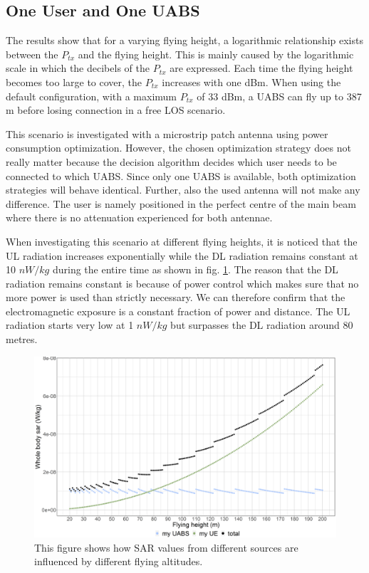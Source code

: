 \documentclass[twocolumn]{phdsymp} %
\begin{document}
\subsection{One User and One \gls{UABS}}
The  results show that for a varying flying height, a logarithmic relationship exists between the $P_{tx}$ and the flying height. 
This is mainly caused by the logarithmic 
scale in which the decibels of the $P_{tx}$ are expressed.
Each time the flying height becomes too large to cover, the 
$P_{tx}$ increases with one dBm. 
When using the default configuration, with a maximum $P_{tx}$ of 33 dBm,
a \gls{UABS} can fly up to 387 m before losing connection in a free \gls{LOS} scenario.

This scenario is investigated with a microstrip patch antenna using power consumption optimization. 
 However, the chosen optimization strategy does not really matter because the decision 
 algorithm decides which user 
needs to be connected to which \gls{UABS}. Since only one \gls{UABS} is available, both optimization strategies will behave identical.
Further, also the used antenna will not make any difference.
The user is namely positioned in the perfect centre of the main beam where there is 
no attenuation experienced for both antennae.

When investigating this scenario at different flying heights, it is noticed
that the \gls{UL} radiation increases exponentially while 
the \gls{DL} radiation remains constant at 10 $nW/kg$ during the entire time as shown in fig. \ref{fig:s1_fhsar}. The reason that the \gls{DL} radiation
remains constant is because of power control which makes sure that no more power is used than strictly necessary. 
We can therefore confirm that the electromagnetic exposure is a constant fraction of power and distance.
The \gls{UL} radiation starts very low at 1 $nW/kg$ but surpasses the \gls{DL} radiation 
around 80 metres.

\begin{figure}[]
\centering
  \includegraphics[width=\linewidth]{fhvssar_extendedAbstract.png}
  \caption{This figure shows how SAR values from different sources are influenced by different flying altitudes.}
  \label{fig:s1_fhsar}
\end{figure}
\end{document}
